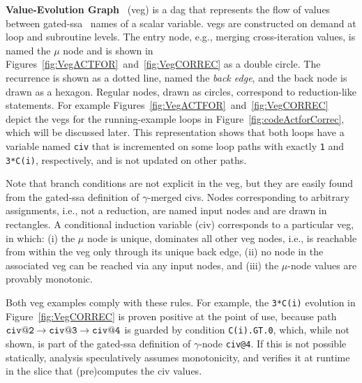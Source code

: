 \documentclass{sig-alternate}
\begin{document}
\vspace{1ex}

{\bf Value-Evolution Graph}~\cite{VEG} ({\sc veg}) is a {\sc dag}  %
that represents the flow of values between gated-{\sc ssa}~\cite{GatedSSA} names 
of a scalar variable.  
%
{\sc veg}s are constructed on demand at loop and subroutine levels.
%
The entry node, e.g., merging cross-iteration values,  is named 
the $\mu$ node and is shown in Figures~\ref{fig:VegACTFOR}~and~\ref{fig:VegCORREC} 
as a double circle. The recurrence is shown as a dotted line, 
named the {\em back edge}, and the back node is drawn as a hexagon.
%
Regular nodes, drawn as circles, correspond to reduction-like statements.
For example Figures~\ref{fig:VegACTFOR}~and~\ref{fig:VegCORREC} 
depict the {\sc veg}s for the running-example loops in 
Figure~\ref{fig:codeActforCorrec}, which will be discussed later. 
This representation shows that both loops
have a variable named {\tt civ} that is incremented on some loop
paths with exactly {\tt 1} and {\tt 3*C(i)}, respectively, 
and is not updated on other paths. 
%

Note that branch conditions are not explicit in the {\sc veg}, 
but they are easily found from the gated-{\sc ssa} definition 
of $\gamma$-merged {\sc civ}s. %
%
Nodes corresponding to arbitrary assignments, i.e., not a reduction, are
named input nodes and are drawn in rectangles. 
%
A conditional induction variable ({\sc civ}) corresponds to a
particular {\sc veg}, in which:
  (i) the $\mu$ node is unique, dominates all other {\sc veg} nodes,
            i.e., is reachable from within the {\sc veg} only through its
            unique back edge, %
%
 (ii) no node in the associated {\sc veg} can be reached via any input nodes, and 
%
(iii) the $\mu$-node values are provably monotonic.
            
Both {\sc veg} examples comply with these rules.
For example, the {\tt 3*C(i)} evolution in 
Figure~\ref{fig:VegCORREC} is proven positive at the 
point of use, because path 
${\tt civ@2}\rightarrow{\tt civ@3}\rightarrow{\tt civ@4}$
is guarded by condition {\tt C(i).GT.0}, which, while not 
shown, is part of the gated-{\sc ssa} definition of $\gamma$-node {\tt civ@4}. 
If this is not possible statically, analysis speculatively
assumes monotonicity, and verifies it at runtime in the slice 
that (pre)computes the {\sc civ} values. 
\end{document}
